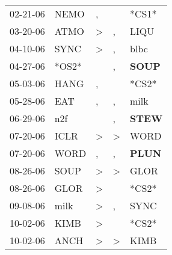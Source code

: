 \begin{supertabular}{p{0.07\textwidth}p{0.06\textwidth}p{0.02\textwidth}p{0.02\textwidth}p{0.06\textwidth}}
          02-21-06\textsuperscript{} &           NEMO\textsuperscript{} &                , &                  &                            *CS1* \\
          03-20-06\textsuperscript{} &           ATMO\textsuperscript{} &     \textgreater &                , &           LIQU\textsuperscript{} \\
          04-10-06\textsuperscript{} &           SYNC\textsuperscript{} &     \textgreater &                , &           blbc\textsuperscript{} \\
          04-27-06\textsuperscript{} &                            *OS2* &                  &                , &  \textbf{SOUP\textsuperscript{}} \\
          05-03-06\textsuperscript{} &           HANG\textsuperscript{} &                , &                  &                            *CS2* \\
          05-28-06\textsuperscript{} &            EAT\textsuperscript{} &                , &                , &           milk\textsuperscript{} \\
          06-29-06\textsuperscript{} &            n2f\textsuperscript{} &                  &                , &  \textbf{STEW\textsuperscript{}} \\
          07-20-06\textsuperscript{} &           ICLR\textsuperscript{} &     \textgreater &     \textgreater &           WORD\textsuperscript{} \\
          07-20-06\textsuperscript{} &           WORD\textsuperscript{} &                , &                , &  \textbf{PLUN\textsuperscript{}} \\
          08-26-06\textsuperscript{} &           SOUP\textsuperscript{} &     \textgreater &     \textgreater &           GLOR\textsuperscript{} \\
          08-26-06\textsuperscript{} &           GLOR\textsuperscript{} &     \textgreater &                  &                            *CS2* \\
          09-08-06\textsuperscript{} &           milk\textsuperscript{} &     \textgreater &                , &           SYNC\textsuperscript{} \\
          10-02-06\textsuperscript{} &           KIMB\textsuperscript{} &     \textgreater &                  &                            *CS2* \\
          10-02-06\textsuperscript{} &           ANCH\textsuperscript{} &     \textgreater &     \textgreater &           KIMB\textsuperscript{} \\

\end{supertabular}
